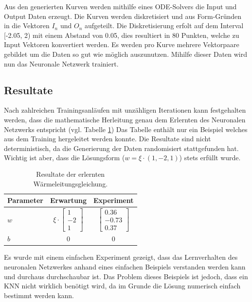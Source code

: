 Aus den generierten Kurven werden mithilfe eines ODE-Solvers die Input und Output Daten erzeugt. Die Kurven werden diskretisiert und aus Form-Gründen in die Vektoren $I_n$ und $O_n$ aufgeteilt. Die Diskretisierung erfolt auf dem Interval [-2.05, 2) mit einem Abstand von 0.05, dies resultiert in 80 Punkten, welche zu Input Vektoren konvertiert werden. Es werden pro Kurve mehrere Vektorpaare gebildet um die Daten so gut wie möglich auszunutzen. Mihilfe dieser Daten wird nun das Neuronale Netzwerk trainiert.

\subsection{Resultate}
Nach zahlreichen Trainingsanläufen mit unzähligen Iterationen kann festgehalten werden, dass die mathematische Herleitung genau dem Erlernten des Neuronalen Netzwerks entspricht (vgl. Tabelle \ref{tbl:result_heat}) Das Tabelle enthält nur ein Beispiel welches aus dem Training hergeleitet werden konnte. Die Resultate sind nicht deterministisch, da die Generierung der Daten randomisiert stattgefunden hat. Wichtig ist aber, dass die Lösungsform ($w = \xi \cdot (1, -2, 1)$) stets erfüllt wurde.

\begin{table}
	\centering
	\def\arraystretch{1.1}
	\begin{tabular}{l|c|c}
		Parameter & Erwartung & Experiment \\
		\hline
		$w$ & $\xi \cdot \begin{bmatrix} 1 \\ -2 \\ 1 \end{bmatrix}$ & $\begin{bmatrix} 0.36 \\ -0.73 \\ 0.37 \end{bmatrix}$ \\
		$b$ & 0 & 0 \\
	\end{tabular}
	\label{tbl:result_heat}
	\caption{Resultate der erlernten Wärmeleitungsgleichung.}
\end{table}

Es wurde mit einem einfachen Experiment gezeigt, dass das Lernverhalten des neuronalen Netzwerkes anhand eines einfachen Beispiels verstanden werden kann und durchaus durchschaubar ist. Das Problem dieses Beispiels ist jedoch, dass ein KNN nicht wirklich benötigt wird, da im Grunde die Lösung numerisch einfach bestimmt werden kann.